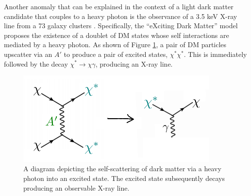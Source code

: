Another anomaly that can be explained in the context of a light dark matter
candidate that couples to a heavy photon is the observance
of a 3.5 keV X-ray line from a 73 galaxy clusters \cite{Bulbul:2014sua}.  
Specifically, the ``eXciting Dark Matter'' model \cite{Finkbeiner:2014sja} 
proposes the existence of a doublet of DM states whose self interactions are 
mediated by a heavy photon. As shown of Figure \ref{fig:dm_self_scat}, a pair
of DM particles upscatter via an $A'$ to produce a pair of excited states, 
$\chi^*\chi^*$. This is immediately followed by the decay 
$\chi^* \rightarrow  \chi\gamma$, producing an X-ray line.
\begin{figure}[t]
    \centering
    \includegraphics[width=0.9\textwidth]{images/xdm.png}
    \caption{A diagram depicting the self-scattering of dark matter via a heavy
             photon into an excited state. The excited state subsequently decays
             producing an observable X-ray line.}
    \label{fig:dm_self_scat}
\end{figure}


